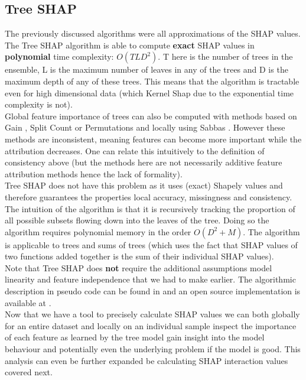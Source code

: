\documentclass[conference]{IEEEtran}
\begin{document}
\subsection{Tree SHAP}
The previously discussed algorithms were all approximations of the SHAP values. The Tree SHAP \cite{b1} algorithm is able to compute \textbf{exact} SHAP values in \textbf{polynomial} time complexity: $O(TLD^2)$. 
T here is the number of trees in the ensemble, L is the maximum number of leaves in any of the trees and D is the maximum depth of any of these trees. 
This means that the algorithm is tractable even for high dimensional data (which Kernel Shap due to the exponential time complexity is not).\\
Global feature importance of trees can also be computed with methods based on Gain \cite{b9}, Split Count \cite{b10} or Permutations \cite{b11} and locally using Sabbas \cite{b12}.
However these methods are inconsistent, meaning features can become more important while the attribution decreases. One can relate this intuitively to the definition of consistency above (but the methods here are not necessarily additive feature attribution methods hence the lack of formality).\\
Tree SHAP does not have this problem as it uses (exact) Shapely values and therefore guarantees the properties local accuracy, missingness and consistency. 
The intuition of the algorithm is that it is recursively tracking the proportion of all possible subsets flowing down into the leaves of the tree. 
Doing so the algorithm requires polynomial memory in the order $O(D^2 + M)$.
The algorithm is applicable to trees and sums of trees (which uses the fact that SHAP values of two functions added together is the sum of their individual SHAP values).\\
Note that Tree SHAP does \textbf{not} require the additional assumptions model linearity and feature independence that we had to make earlier. The algorithmic description in pseudo code can be found in \cite{b1} and an open source implementation is available at \cite{b13}.\\

Now that we have a tool to precisely calculate SHAP values we can both globally for an entire dataset and locally on an individual sample inspect the importance of each feature as learned by the tree model gain insight into the model behaviour and potentially even the underlying problem if the model is good.
This analysis can even be further expanded be calculating SHAP interaction values covered next.
\end{document}
